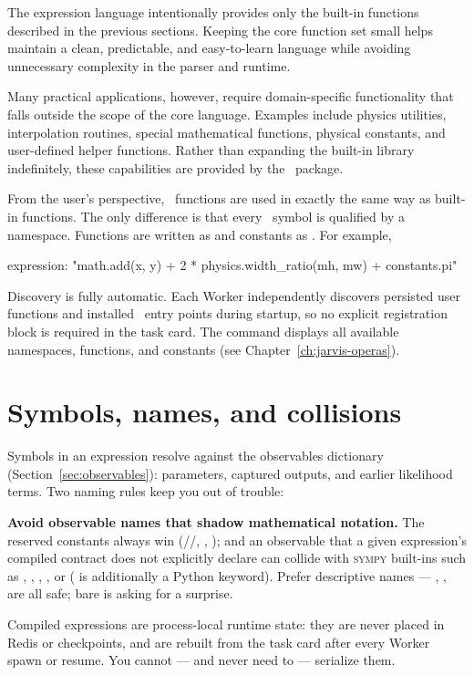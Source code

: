 The expression language intentionally provides only the built-in functions described in the previous sections. Keeping the core function set small helps maintain a clean, predictable, and easy-to-learn language while avoiding unnecessary complexity in the parser and runtime.

Many practical applications, however, require domain-specific functionality that falls outside the scope of the core language. Examples include physics utilities, interpolation routines, special mathematical functions, physical constants, and user-defined helper functions. Rather than expanding the built-in library indefinitely, these capabilities are provided by the \Operas\ package.

From the user's perspective, \Operas\ functions are used in exactly the same way as built-in functions. The only difference is that every \Operas\ symbol is qualified by a namespace. Functions are written as  and constants as . For example,

\begin{yamlwin}
expression: "math.add(x, y) + 2 * physics.width_ratio(mh, mw) + constants.pi"
\end{yamlwin}

Discovery is fully automatic. Each Worker independently discovers persisted user functions and installed \Operas\ entry points during startup, so no explicit registration block is required in the task card. The command  displays all available namespaces, functions, and constants (see Chapter~\ref{ch:jarvis-operas}).

\section{Symbols, names, and collisions}
\label{sec:expr-collisions}

Symbols in an expression resolve against the observables dictionary
(Section~\ref{sec:observables}): parameters, captured outputs, and earlier likelihood
terms. Two naming rules keep you out of trouble:

\begin{jwarn}
\textbf{Avoid observable names that shadow mathematical notation.} The reserved constants
always win (//, , ); and an observable that a given expression's
compiled contract does not explicitly declare can collide with \textsc{sympy} built-ins
such as , , , , or 
( is additionally a Python keyword). Prefer descriptive names ---
, ,  are all safe; bare  is asking
for a surprise.
\end{jwarn}

\begin{jnote}
Compiled expressions are process-local runtime state: they are never placed in Redis or
checkpoints, and are rebuilt from the task card after every Worker spawn or resume. You
cannot --- and never need to --- serialize them.
\end{jnote}
